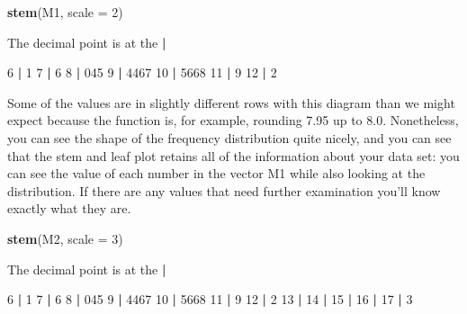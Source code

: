 \documentclass[
]{book}
\newenvironment{Shaded}{\begin{snugshade}}{\end{snugshade}}
\newcommand{\DataTypeTok}[1]{\textcolor[rgb]{0.13,0.29,0.53}{#1}}
\newcommand{\DecValTok}[1]{\textcolor[rgb]{0.00,0.00,0.81}{#1}}
\newcommand{\KeywordTok}[1]{\textcolor[rgb]{0.13,0.29,0.53}{\textbf{#1}}}
\newcommand{\NormalTok}[1]{#1}
\newcommand{\OperatorTok}[1]{\textcolor[rgb]{0.81,0.36,0.00}{\textbf{#1}}}
\newcommand{\StringTok}[1]{\textcolor[rgb]{0.31,0.60,0.02}{#1}}
\begin{document}
\begin{Shaded}
\begin{Highlighting}[]
\KeywordTok{stem}\NormalTok{(M1, }\DataTypeTok{scale =} \DecValTok{2}\NormalTok{)}

\NormalTok{  The decimal point is at the }\OperatorTok{|}

\StringTok{   }\DecValTok{6} \OperatorTok{|}\StringTok{ }\DecValTok{1}
   \DecValTok{7} \OperatorTok{|}\StringTok{ }\DecValTok{6}
   \DecValTok{8} \OperatorTok{|}\StringTok{ }\DecValTok{045}
   \DecValTok{9} \OperatorTok{|}\StringTok{ }\DecValTok{4467}
  \DecValTok{10} \OperatorTok{|}\StringTok{ }\DecValTok{5668}
  \DecValTok{11} \OperatorTok{|}\StringTok{ }\DecValTok{9}
  \DecValTok{12} \OperatorTok{|}\StringTok{ }\DecValTok{2}
\end{Highlighting}
\end{Shaded}

Some of the values are in slightly different rows with this diagram than we might expect because the function is, for example, rounding 7.95 up to 8.0. Nonetheless, you can see the shape of the frequency distribution quite nicely, and you can see that the stem and leaf plot retains all of the information about your data set: you can see the value of each number in the vector M1 while also looking at the distribution. If there are any values that need further examination you'll know exactly what they are.

\begin{Shaded}
\begin{Highlighting}[]
\KeywordTok{stem}\NormalTok{(M2, }\DataTypeTok{scale =} \DecValTok{3}\NormalTok{)}

\NormalTok{  The decimal point is at the }\OperatorTok{|}

\StringTok{   }\DecValTok{6} \OperatorTok{|}\StringTok{ }\DecValTok{1}
   \DecValTok{7} \OperatorTok{|}\StringTok{ }\DecValTok{6}
   \DecValTok{8} \OperatorTok{|}\StringTok{ }\DecValTok{045}
   \DecValTok{9} \OperatorTok{|}\StringTok{ }\DecValTok{4467}
  \DecValTok{10} \OperatorTok{|}\StringTok{ }\DecValTok{5668}
  \DecValTok{11} \OperatorTok{|}\StringTok{ }\DecValTok{9}
  \DecValTok{12} \OperatorTok{|}\StringTok{ }\DecValTok{2}
  \DecValTok{13} \OperatorTok{|}\StringTok{ }
\StringTok{  }\DecValTok{14} \OperatorTok{|}\StringTok{ }
\StringTok{  }\DecValTok{15} \OperatorTok{|}\StringTok{ }
\StringTok{  }\DecValTok{16} \OperatorTok{|}\StringTok{ }
\StringTok{  }\DecValTok{17} \OperatorTok{|}\StringTok{ }\DecValTok{3}
\end{Highlighting}
\end{Shaded}
\end{document}
